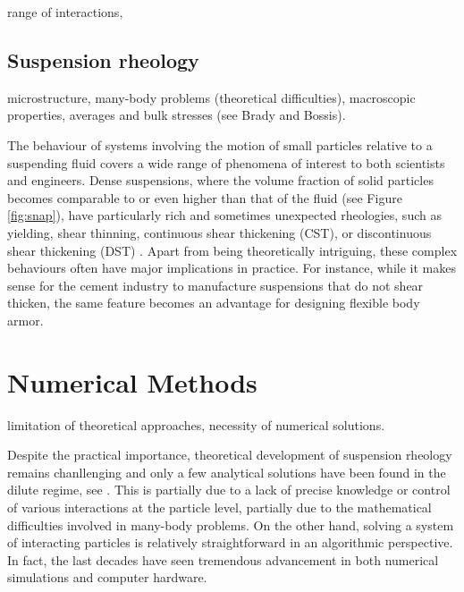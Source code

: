 range of interactions,


\section{Suspension rheology}
\label{sec:sus-rheo}

microstructure,
many-body problems (theoretical difficulties),
macroscopic properties, averages and bulk stresses (see Brady and Bossis).

The behaviour of systems involving the motion of small particles relative to a suspending fluid covers a wide range of phenomena of interest to both scientists and engineers. Dense suspensions, where the volume fraction of solid particles becomes comparable to or even higher than that of the fluid (see Figure \ref{fig:snap}), have particularly rich and sometimes unexpected rheologies, such as yielding, shear thinning, continuous shear thickening (CST), or discontinuous shear thickening (DST) \citep{mewis_wagner_book, Morton_Morris_2014, guazzelli_pouliquen_2018, Morris_annurev2020}. Apart from being theoretically intriguing, these complex behaviours often have major implications in practice. For instance, while it makes sense for the cement industry to manufacture suspensions that do not shear thicken, the same feature becomes an advantage for designing flexible body armor.



\chapter{Numerical Methods}



limitation of theoretical approaches,
necessity of numerical solutions.

Despite the practical importance, theoretical development of suspension rheology remains chanllenging and only a few analytical solutions have been found in the dilute regime, see \eg \cite{Einstein_1906, batchelor_green_1972b}. This is partially due to a lack of precise knowledge or control of various interactions at the particle level, partially due to the mathematical difficulties involved in many-body problems. On the other hand, solving a system of interacting particles is relatively straightforward in an algorithmic perspective. In fact, the last decades have seen tremendous advancement in both numerical simulations and computer hardware.

